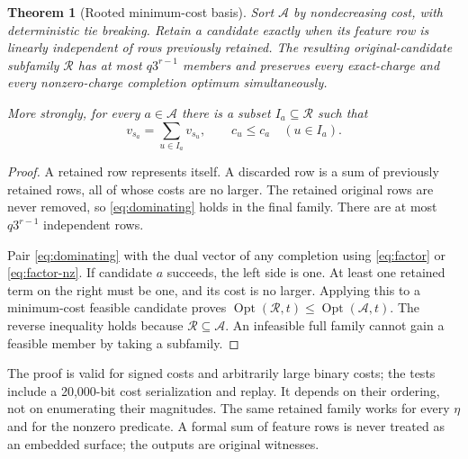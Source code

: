 \documentclass[11pt,letterpaper]{article}
\newtheorem{theorem}{Theorem}[section]
\theoremstyle{definition}
\newcommand{\Opt}{\operatorname{Opt}}
\begin{document}
\begin{theorem}[Rooted minimum-cost basis]\label{thm:basis}
Sort $\mathcal A$ by nondecreasing cost, with deterministic tie breaking. Retain a candidate exactly when its feature row is linearly independent of rows previously retained. The resulting original-candidate subfamily $\mathcal R$ has at most $q3^{r-1}$ members and preserves every exact-charge and every nonzero-charge completion optimum simultaneously.

More strongly, for every $a\in\mathcal A$ there is a subset $I_a\subseteq\mathcal R$ such that
\begin{equation}
 v_{s_a}=\sum_{u\in I_a}v_{s_u},\qquad c_u\leq c_a\quad(u\in I_a).\label{eq:dominating}
\end{equation}
\end{theorem}
\begin{proof}
A retained row represents itself. A discarded row is a sum of previously retained rows, all of whose costs are no larger. The retained original rows are never removed, so \eqref{eq:dominating} holds in the final family. There are at most $q3^{r-1}$ independent rows.

Pair \eqref{eq:dominating} with the dual vector of any completion using \eqref{eq:factor} or \eqref{eq:factor-nz}. If candidate $a$ succeeds, the left side is one. At least one retained term on the right must be one, and its cost is no larger. Applying this to a minimum-cost feasible candidate proves $\Opt(\mathcal R,t)\leq\Opt(\mathcal A,t)$. The reverse inequality holds because $\mathcal R\subseteq\mathcal A$. An infeasible full family cannot gain a feasible member by taking a subfamily.
\end{proof}

The proof is valid for signed costs and arbitrarily large binary costs; the tests include a 20,000-bit cost serialization and replay. It depends on their ordering, not on enumerating their magnitudes. The same retained family works for every $\eta$ and for the nonzero predicate. A formal sum of feature rows is never treated as an embedded surface; the outputs are original witnesses.
\end{document}

